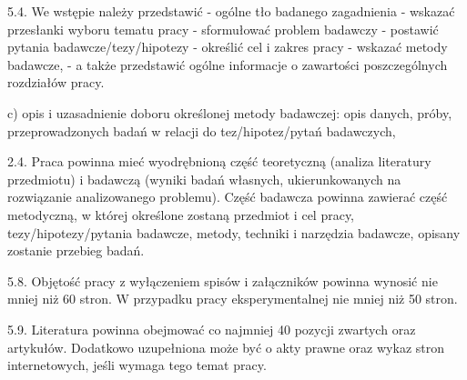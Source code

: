 5.4. We wstępie należy przedstawić 
- ogólne tło badanego zagadnienia
- wskazać przesłanki wyboru tematu pracy
- sformułować problem badawczy
- postawić pytania badawcze/tezy/hipotezy
- określić cel i zakres pracy
- wskazać metody badawcze,
- a także przedstawić ogólne informacje o zawartości poszczególnych rozdziałów pracy.

c) opis i uzasadnienie doboru określonej metody badawczej: opis danych, próby,
przeprowadzonych badań w relacji do tez/hipotez/pytań badawczych,

2.4. Praca powinna mieć wyodrębnioną część teoretyczną (analiza literatury przedmiotu)
i badawczą (wyniki badań własnych, ukierunkowanych na rozwiązanie analizowanego
problemu). Część badawcza powinna zawierać część metodyczną, w której określone zostaną
przedmiot i cel pracy, tezy/hipotezy/pytania badawcze, metody, techniki i narzędzia
badawcze, opisany zostanie przebieg badań.

5.8. Objętość pracy z wyłączeniem spisów i załączników powinna wynosić nie mniej
niż 60 stron. W przypadku pracy eksperymentalnej nie mniej niż 50 stron.

5.9. Literatura powinna obejmować co najmniej 40 pozycji zwartych oraz artykułów.
Dodatkowo uzupełniona może być o akty prawne oraz wykaz stron internetowych, jeśli
wymaga tego temat pracy.